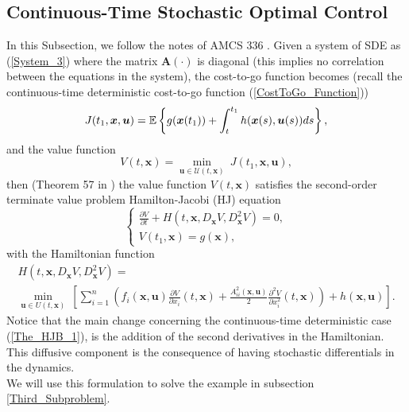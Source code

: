 \subsection{Continuous-Time Stochastic Optimal Control} \label{Subsecion_CTSOC}

In this Subsection, we follow the notes of AMCS 336 \cite{carlsson2010stochastic}. Given 
a system of SDE as (\ref{System_3}) where the matrix $\bm{A}(\cdot)$ is diagonal (this implies no correlation between the equations in the system), the 
cost-to-go function becomes (recall the continuous-time deterministic cost-to-go 
function (\ref{CostToGo_Function}))
\begin{equation}
J(t_1,\bm{x},\bm{u})=\mathbb{E}\left\{g(\bm{x}(t_1))+\int_{t}^{t_1}h(\bm{x}(s),\bm{u}(s))ds\right\},
\label{CostToGo_Function_2}
\end{equation}
and the value function
\begin{equation}
V(t,\bm{x})=\min_{\bm{u}\in \mathcal{U}(t,\bm{x})}\ J(t_1,\bm{x},\bm{u}),
\label{The_Value_Function}
\end{equation}
then (Theorem 57 in \cite{carlsson2010stochastic}) the value function $V(t,\bm{x})$ satisfies 
the second-order terminate value problem Hamilton-Jacobi (HJ) equation
\begin{equation}
\begin{cases}
\frac{\partial V}{\partial t}+H(t,\bm{x},D_{\bm{x}}V,D_{\bm{x}}^2V)=0,\\
V(t_1,\bm{x})=g(\bm{x}),
\end{cases}
\label{The_HJB_Equation}
\end{equation}
with the Hamiltonian function
\begin{multline}
H(t,\bm{x},D_{\bm{x}}V,D_{\bm{x}}^2V)=\\
\min_{\bm{u}\in U(t,\bm{x})}\ \left[\sum_{i=1}^n\left(f_i(\bm{x},\bm{u})\frac{\partial V}{\partial x_i}(t,\bm{x})+\frac{A_{ii}^2(\bm{x},\bm{u})}{2}\frac{\partial^2V}{\partial x_i^2}(t,\bm{x})\right)+h(\bm{x},\bm{u})\right].
\end{multline}
Notice that the main change concerning the continuous-time deterministic case (\ref{The_HJB_1}), is the addition of the second derivatives in the Hamiltonian. This diffusive component is the consequence of having stochastic differentials in the dynamics.\\
We will use this formulation to solve the example in subsection \ref{Third_Subproblem}.\\
\\

